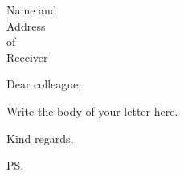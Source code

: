 \documentclass[a4paper,12pt]{letter}
\begin{document}
\begin{letter}{Name and \\ Address \\ of \\ Receiver}

\opening{Dear colleague,}
Write the body of your letter here.


\closing{Kind regards,}

\cc{} %
\encl{} %
\ps{} %

\end{letter}
\end{document}
